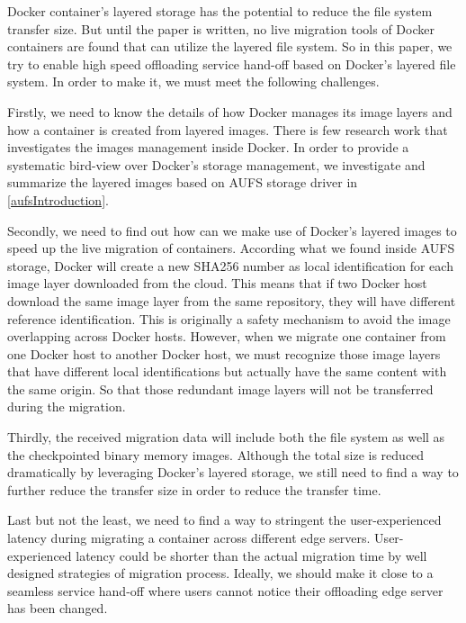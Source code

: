 Docker container's layered storage has the potential to reduce the file system transfer size. But until the paper is written, no live migration tools of Docker containers are found that can utilize the layered file system. 
So in this paper, we try to enable high speed offloading service hand-off based on Docker's layered file system. In order to make it, we must meet the following challenges.

Firstly, we need to know the details of how Docker manages its image layers and how a container is created from layered images. There is few research work that investigates the images management inside Docker. In order to provide a systematic bird-view over Docker's storage management, we investigate and summarize the layered images based on AUFS storage driver in \ref{aufsIntroduction}.

Secondly, we need to find out how can we make use of Docker's layered images to speed up the live migration of containers. According what we found inside AUFS storage, Docker will create a new SHA256 number as local  identification for each image layer downloaded from the cloud. 
This means that if two Docker host download the same image layer from the same repository, they will have different reference identification. This is originally a safety mechanism to avoid the image overlapping across Docker hosts\cite{dockerlayer}. 
However, when we migrate one container from one Docker host to another Docker host, we must recognize those image layers that have different local identifications but actually have the same content with the same origin. So that those redundant image layers will not be transferred during the migration.

Thirdly, the received migration data will include both the file system as well as the checkpointed binary memory images. Although the total size is reduced dramatically by leveraging Docker's layered storage, we still need to find a way to further reduce the transfer size in order to reduce the transfer time. 

Last but not the least, we need to find a way to stringent the user-experienced latency during migrating a container across different edge servers. User-experienced latency could be shorter than the actual migration time by well designed strategies of migration process. Ideally, we should make it close to a seamless service hand-off where users cannot notice their offloading edge server has been changed.

